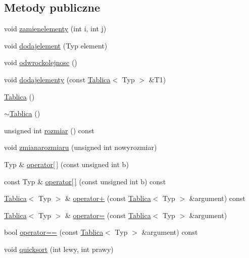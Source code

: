 \subsection*{Metody publiczne}
\begin{DoxyCompactItemize}
\item 
void \hyperlink{class_tablica_aea49337f0b2ee035ddc1df13ff228511}{zamienelementy} (int i, int j)
\item 
void \hyperlink{class_tablica_a630e070c59709cdfe436db9b2f57c81f}{dodajelement} (Typ element)
\item 
void \hyperlink{class_tablica_a405e0d82e9594f27cfc9dac94e53b582}{odwrockolejnosc} ()
\item 
void \hyperlink{class_tablica_ad139387fb64394e133e1e1b3402f7290}{dodajelementy} (const \hyperlink{class_tablica}{Tablica}$<$ Typ $>$ \&T1)
\item 
\hyperlink{class_tablica_a7d54bbcaa7963c50ee57e69f700b6cfc}{Tablica} ()
\item 
\hyperlink{class_tablica_aea2479778376598550fe82ec459a24ba}{$\sim$\-Tablica} ()
\item 
unsigned int \hyperlink{class_tablica_acf3f8d852711619ed205e1569f40f789}{rozmiar} () const 
\item 
void \hyperlink{class_tablica_aafcf1f86b79c0146fa313bae711cc97e}{zmianarozmiaru} (unsigned int nowyrozmiar)
\item 
Typ \& \hyperlink{class_tablica_a87f292495232b4f959291a3bc87bb829}{operator\mbox{[}$\,$\mbox{]}} (const unsigned int b)
\item 
const Typ \& \hyperlink{class_tablica_a5d41b52977f5bc0a3abf9e62cc209cc4}{operator\mbox{[}$\,$\mbox{]}} (const unsigned int b) const 
\item 
\hyperlink{class_tablica}{Tablica}$<$ Typ $>$ \& \hyperlink{class_tablica_ae0716b9a85eb0306d3a722376727be6e}{operator+} (const \hyperlink{class_tablica}{Tablica}$<$ Typ $>$ \&argument) const 
\item 
\hyperlink{class_tablica}{Tablica}$<$ Typ $>$ \& \hyperlink{class_tablica_a3626fbc8c7e54b24e7fba96b86a4173f}{operator=} (const \hyperlink{class_tablica}{Tablica}$<$ Typ $>$ \&argument)
\item 
bool \hyperlink{class_tablica_a5feb149bbeae655c6d7bafada90f9615}{operator==} (const \hyperlink{class_tablica}{Tablica}$<$ Typ $>$ \&argument) const 
\item 
void \hyperlink{class_tablica_a56d18f9872a1f48b9817334eba662437}{quicksort} (int lewy, int prawy)
\item 

\end{DoxyCompactItemize}
